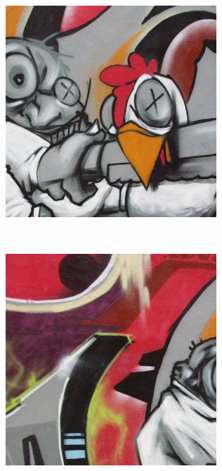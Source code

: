 \documentclass[review]{elsarticle}
\begin{document}
\begin{figure}[htb]
\begin{subfigure}[t]{0.16\columnwidth}
    \end{subfigure}%
    ~~ %
    \begin{subfigure}[t]{0.16\columnwidth}
        \centering
        \includegraphics[width=1\columnwidth]{images/acr/patches/patch_3_1}
    \end{subfigure}%
    ~~ %
    \begin{subfigure}[t]{0.16\columnwidth}
        \centering
        \includegraphics[width=1\columnwidth]{images/acr/patches/patch_4_1}

\end{subfigure}
\end{figure}
\end{document}
